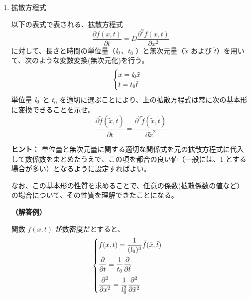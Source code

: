 \documentclass[uplatex,dvipdfmx,a4paper,11pt]{jsarticle}
\newcommand{\difp}[2]{\dfrac{\partial #1}{\partial #2}}
\newcommand{\difpp}[2]{\dfrac{\partial^2 #1}{\partial #2^2}}
\begin{document}
\begin{enumerate}
\setlength{\parskip}{0cm} %
\setlength{\itemsep}{0.5cm} %

\item
拡散方程式

以下の表式で表される、拡散方程式
\begin{equation*}
\difp{f(x, t)}{t} = D \difpp{f(x, t)}{x}
\end{equation*}
に対して、長さと時間の単位量（${\it l}_0$、$t_0$ ）と無次元量（$\tilde{x}$ および $\tilde{t}$）を用いて、次のような変数変換(無次元化)を行う。
\begin{equation*}
\begin{cases}
x= {\it l}_0 \tilde{x} \\
t = t_0 \tilde{t}
\end{cases}
\end{equation*}
単位量 ${\it l}_0$ と $t_0$ を適切に選ぶことにより、上の拡散方程式は常に次の基本形に変換できることを示せ。
\begin{equation*}
\difp{\tilde{f}(\tilde{x}, \tilde{t})}{\tilde{t}} = \difpp{ \tilde{f}(\tilde{x}, \tilde{t})}{\tilde{x}}
\end{equation*}

\begin{itembox}[l]{{\bf ヒント：}}
単位量と無次元量に関する適切な関係式を元の拡散方程式に代入して数係数をまとめたうえで、この項を都合の良い値（一般には、1 とする場合が多い）となるように設定すればよい。

なお、この基本形の性質を求めることで、任意の係数(拡散係数の値など）の場合について、その性質を理解できたことになる。

\end{itembox}

\vspace{10pt}

{\bf （解答例）}

関数 $f(x, t)$ が数密度だとすると、
\begin{align*}
\begin{cases}
f(x,t) = \dfrac{1}{(l_0)^3} \tilde{f}(\tilde{x}, \tilde{t}) \notag \\[10pt]
\difp{}{t} = \dfrac{1}{t_0} \difp{}{\tilde{t}} \notag \\[10pt]
\difpp{}{x} = \dfrac{1}{l_0^2} \difpp{}{\tilde{x}}
\end{cases}
\end{align*}


\end{enumerate}
\end{document}

